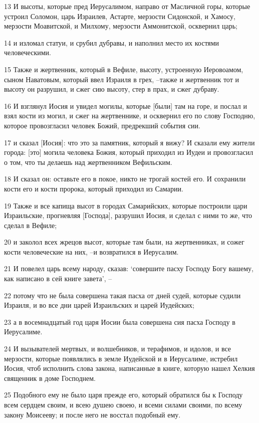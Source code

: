\par 13 И высоты, которые пред Иерусалимом, направо от Масличной горы, которые устроил Соломон, царь Израилев, Астарте, мерзости Сидонской, и Хамосу, мерзости Моавитской, и Милхому, мерзости Аммонитской, осквернил царь;
\par 14 и изломал статуи, и срубил дубравы, и наполнил место их костями человеческими.
\par 15 Также и жертвенник, который в Вефиле, высоту, устроенную Иеровоамом, сыном Наватовым, который ввел Израиля в грех, --также и жертвенник тот и высоту он разрушил, и сжег сию высоту, стер в прах, и сжег дубраву.
\par 16 И взглянул Иосия и увидел могилы, которые [были] там на горе, и послал и взял кости из могил, и сжег на жертвеннике, и осквернил его по слову Господню, которое провозгласил человек Божий, предрекший события сии.
\par 17 и сказал [Иосия]: что это за памятник, который я вижу? И сказали ему жители города: [это] могила человека Божия, который приходил из Иудеи и провозгласил о том, что ты делаешь над жертвенником Вефильским.
\par 18 И сказал он: оставьте его в покое, никто не трогай костей его. И сохранили кости его и кости пророка, который приходил из Самарии.
\par 19 Также и все капища высот в городах Самарийских, которые построили цари Израильские, прогневляя [Господа], разрушил Иосия, и сделал с ними то же, что сделал в Вефиле;
\par 20 и заколол всех жрецов высот, которые там были, на жертвенниках, и сожег кости человеческие на них, --и возвратился в Иерусалим.
\par 21 И повелел царь всему народу, сказав: `совершите пасху Господу Богу вашему, как написано в сей книге завета', --
\par 22 потому что не была совершена такая пасха от дней судей, которые судили Израиля, и во все дни царей Израильских и царей Иудейских;
\par 23 а в восемнадцатый год царя Иосии была совершена сия пасха Господу в Иерусалиме.
\par 24 И вызывателей мертвых, и волшебников, и терафимов, и идолов, и все мерзости, которые появлялись в земле Иудейской и в Иерусалиме, истребил Иосия, чтоб исполнить слова закона, написанные в книге, которую нашел Хелкия священник в доме Господнем.
\par 25 Подобного ему не было царя прежде его, который обратился бы к Господу всем сердцем своим, и всею душею своею, и всеми силами своими, по всему закону Моисееву; и после него не восстал подобный ему.
